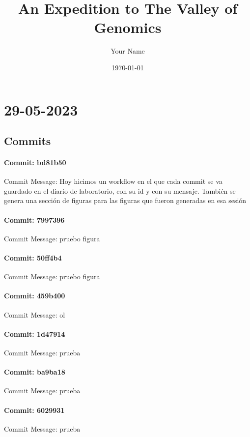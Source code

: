 \documentclass{article}
\begin{document}
\title{An Expedition to The Valley of Genomics}
\author{Your Name}
\date{\today}

\maketitle



\section{29-05-2023}
\subsection{Commits}
\paragraph{Commit: bd81b50}
Commit Message: Hoy hicimos un workflow en el que cada commit se va guardado en el diario de laboratorio, con su id y con su mensaje. También se genera una sección de figuras para las figuras que fueron generadas en esa sesión

\paragraph{Commit: 7997396}
Commit Message: pruebo figura

\paragraph{Commit: 50ff4b4}
Commit Message: pruebo figura

\paragraph{Commit: 459b400}
Commit Message: ol

\paragraph{Commit: 1d47914}
Commit Message: prueba

\paragraph{Commit: ba9ba18}
Commit Message: prueba

\paragraph{Commit: 6029931}
Commit Message: prueba
\end{document}
